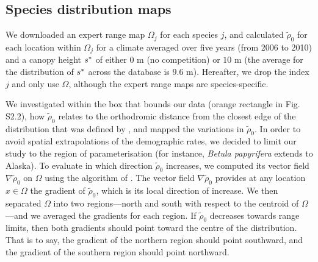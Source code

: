 \subsection{Species distribution maps}
We downloaded an expert range map $ \Omega_j $ \citep{Prasad2003, Little1971} for each species $ j $, and calculated $ \tilde \rho_0 $ for each location within $ \Omega_j $ for a climate averaged over five years (from 2006 to 2010) and a canopy height $ {s}^{*} $ of either $ 0 $ m (no competition) or $ 10 $ m (the average for the distribution of $ {s}^{*} $ across the database is $ 9.6 $ m). Hereafter, we drop the index $ j $ and only use $ \Omega $, although the expert range maps are species-specific.

We investigated within the box that bounds our data (orange rectangle in Fig. S2.2), how $ \tilde \rho_0 $ relates to the orthodromic distance from the closest edge of the distribution that was defined by \citet{Little1971}, and mapped the variations in $ \tilde \rho_0 $. In order to avoid spatial extrapolations of the demographic rates, we decided to limit our study to the region of parameterisation (for instance, \textit{Betula papyrifera} extends to Alaska). To evaluate in which direction $ \tilde \rho_0 $ increases, we computed its vector field $ \nabla \tilde \rho_0 $ on $ \Omega $ using the algorithm of \citet{Ritter1987}. The vector field $ \nabla \tilde \rho_0 $ provides at any location $ x \in \Omega $ the gradient of $ \tilde \rho_0 $, which is its local direction of increase. We then separated $ \Omega $ into two regions---north and south with respect to the centroid of $ \Omega $---and we averaged the gradients for each region. If $ \tilde \rho_0 $ decreases towards range limits, then both gradients should point toward the centre of the distribution. That is to say, the gradient of the northern region should point southward, and the gradient of the southern region should point northward. \\

